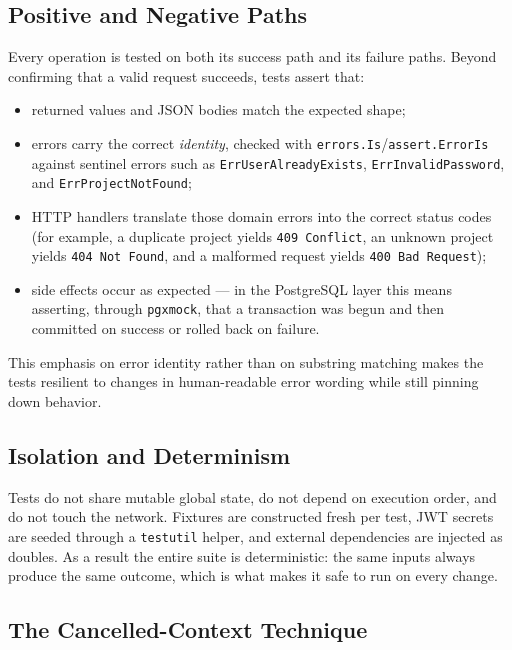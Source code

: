 \subsection{Positive and Negative Paths}

Every operation is tested on both its success path and its failure paths. Beyond confirming that a valid request succeeds, tests assert that:

\begin{itemize}
    \item returned values and JSON bodies match the expected shape;
    \item errors carry the correct \emph{identity}, checked with \texttt{errors.Is}/\texttt{assert.ErrorIs} against sentinel errors such as \texttt{ErrUserAlreadyExists}, \texttt{ErrInvalidPassword}, and \texttt{ErrProjectNotFound};
    \item HTTP handlers translate those domain errors into the correct status codes (for example, a duplicate project yields \texttt{409 Conflict}, an unknown project yields \texttt{404 Not Found}, and a malformed request yields \texttt{400 Bad Request});
    \item side effects occur as expected --- in the PostgreSQL layer this means asserting, through \texttt{pgxmock}, that a transaction was begun and then committed on success or rolled back on failure.
\end{itemize}

This emphasis on error identity rather than on substring matching makes the tests resilient to changes in human-readable error wording while still pinning down behavior.

\subsection{Isolation and Determinism}

Tests do not share mutable global state, do not depend on execution order, and do not touch the network. Fixtures are constructed fresh per test, JWT secrets are seeded through a \texttt{testutil} helper, and external dependencies are injected as doubles. As a result the entire suite is deterministic: the same inputs always produce the same outcome, which is what makes it safe to run on every change.

\subsection{The Cancelled-Context Technique}

